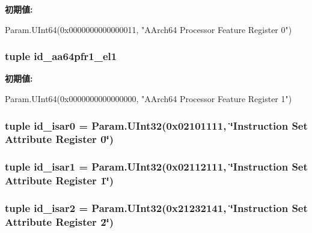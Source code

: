 \label{classArmISA_1_1ArmISA_a97479937aaafcc7638ff69bdb8ef3bf5}
{\bfseries 初期値:}
\begin{DoxyCode}
Param.UInt64(0x0000000000000011,
        "AArch64 Processor Feature Register 0")
\end{DoxyCode}
\hypertarget{classArmISA_1_1ArmISA_ac5dbfd243326cded368de7fd0651226d}{
\subsubsection[{id\_\-aa64pfr1\_\-el1}]{\setlength{\rightskip}{0pt plus 5cm}tuple {\bf id\_\-aa64pfr1\_\-el1}}}
\label{classArmISA_1_1ArmISA_ac5dbfd243326cded368de7fd0651226d}
{\bfseries 初期値:}
\begin{DoxyCode}
Param.UInt64(0x0000000000000000,
        "AArch64 Processor Feature Register 1")
\end{DoxyCode}
\hypertarget{classArmISA_1_1ArmISA_aa8f6b6f5dfeb7e39605c16828ecf8632}{
\subsubsection[{id\_\-isar0}]{\setlength{\rightskip}{0pt plus 5cm}tuple {\bf id\_\-isar0} = Param.UInt32(0x02101111, \char`\"{}Instruction Set Attribute Register 0\char`\"{})}}
\label{classArmISA_1_1ArmISA_aa8f6b6f5dfeb7e39605c16828ecf8632}
\hypertarget{classArmISA_1_1ArmISA_abd2f8799402edf75efe951f1cbbe46a7}{
\subsubsection[{id\_\-isar1}]{\setlength{\rightskip}{0pt plus 5cm}tuple {\bf id\_\-isar1} = Param.UInt32(0x02112111, \char`\"{}Instruction Set Attribute Register 1\char`\"{})}}
\label{classArmISA_1_1ArmISA_abd2f8799402edf75efe951f1cbbe46a7}
\hypertarget{classArmISA_1_1ArmISA_ae11a7345ff321d9862ad5d191c1b0c00}{
\subsubsection[{id\_\-isar2}]{\setlength{\rightskip}{0pt plus 5cm}tuple {\bf id\_\-isar2} = Param.UInt32(0x21232141, \char`\"{}Instruction Set Attribute Register 2\char`\"{})}}
